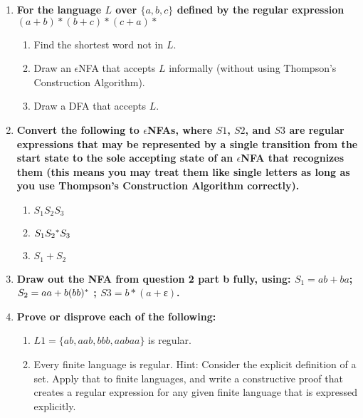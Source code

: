 

\begin{enumerate}

\item \textbf{For the language $L$ over $\{a,b,c\}$ defined by the regular expression $(a+b)*(b+c)*(c+a)*$}

\begin{enumerate}
    \item Find the shortest word not in $L$.
    \item Draw an $\epsilon$NFA that accepts $L$ informally (without using Thompson's Construction Algorithm).
    \item Draw a DFA that accepts $L$.

\end{enumerate}

\newpage

\item \textbf{Convert the following to $\epsilon$NFAs, where $S1$, $S2$, and
    $S3$ are regular expressions that may be represented by a single
    transition from the start state to the sole accepting state of an
    $\epsilon$NFA that recognizes them (this means you may treat them like
    single letters as long as you use Thompson's Construction Algorithm correctly).}

\begin{enumerate}
    \item $S_1 S_2 S_3$
    \item $S_1 S_2 {}^\ast S_3$
    \item $S_1 + S_2$

\end{enumerate}

\newpage

\item \textbf{Draw out the NFA from question 2 part b fully,
    using:  $S_1 = ab+ba$;  $S_2 = aa+b(bb){}^\ast$ ;
    $S3 = b*(a+ɛ)$.}


\newpage
\item \textbf{Prove or disprove each of the following:}

\begin{enumerate}
    \item $L1 = \{ab, aab, bbb, aabaa\}$ is regular.
    \item Every finite language is regular. Hint: Consider the explicit definition of a set. Apply that to finite languages, and write a constructive proof that creates a regular expression for any given finite language that is expressed explicitly.


\end{enumerate}
\end{enumerate}

